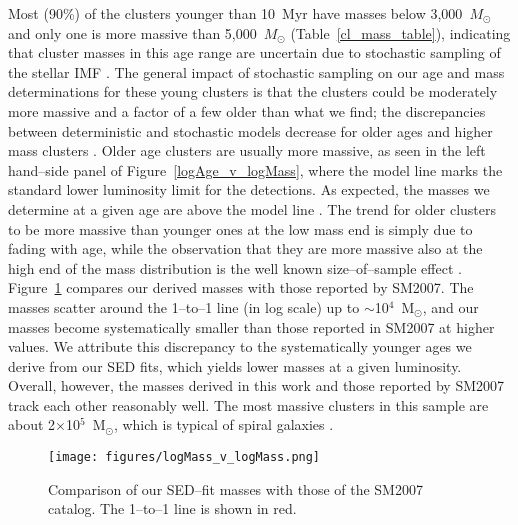 \documentclass{aastex63}
\begin{document}
Most (90\%) of the clusters younger than 10~Myr have masses below 3,000~$M_{\odot}$ and only one is more massive than 5,000~$M_{\odot}$ (Table~\ref{cl_mass_table}), indicating that cluster masses in this age range are uncertain due to stochastic sampling of the stellar IMF \citep{Adamo+2017}. 
The general impact of stochastic  sampling on our age and mass determinations for these young clusters is that the clusters could be moderately more massive and a factor of a few older than what we find; the discrepancies between deterministic and stochastic models decrease for older ages and higher mass clusters \citep[][, their Figure~14]{Krumholz+2015}.
Older age clusters are usually  more massive, as seen in the left hand--side panel of Figure~\ref{logAge_v_logMass}, where the model line marks the standard lower luminosity limit for the detections. As expected, the masses we determine at a given age are above the model line \citep[SM2007; see, also,][]{Adamo+2017}. The trend for older clusters to be more massive than younger ones at the low mass end is simply due to fading with age, while the observation that they are more massive also at the high end of the mass distribution is the well known size--of--sample effect \citep{Hunter+2003}. Figure~\ref{logMass_comp} compares our derived masses with those reported by SM2007. The masses scatter around the 1--to--1 line (in log scale) up to $\sim$10$^4$~M$_{\odot}$, and our masses become systematically smaller than those reported in SM2007 at higher values. We attribute this discrepancy to the systematically younger ages we derive from our SED fits, which yields lower masses at a given luminosity. Overall, however, the masses derived in this work and those reported by SM2007 track each other reasonably well. The most massive clusters in this sample are about 2$\times$10$^5$~M$_{\odot}$, which is typical of spiral galaxies \citep{Larsen2009, Adamo+2018}.

\begin{figure}[ht]
 \centering
 \texttt{[image: figures/logMass\_v\_logMass.png]}
    \caption{Comparison of our SED--fit masses with those of the SM2007 catalog. The 1--to--1 line is shown in red.}
        \label{logMass_comp}
\end{figure}
\end{document}
